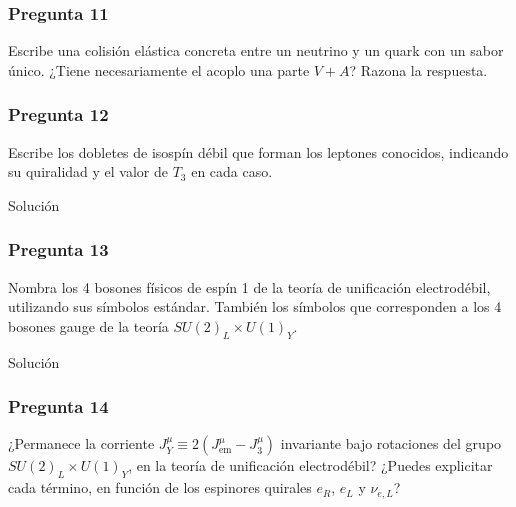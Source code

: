 \vspace*{2em}
\begin{Enunciado}
	\subsubsection*{Pregunta 11}

	Escribe una colisión elástica concreta entre un neutrino y un quark con un sabor único. ¿Tiene necesariamente el acoplo una parte $V + A$? Razona la respuesta.

\end{Enunciado}

\vspace*{2em}

\begin{Enunciado}
	\subsubsection*{Pregunta 12}

	Escribe los dobletes de isospín débil que forman los leptones conocidos, indicando su quiralidad y el valor de $T_3$ en cada caso.

\end{Enunciado}

Solución

\vspace*{2em}

\begin{Enunciado}
	\subsubsection*{Pregunta 13}

	Nombra los 4 bosones físicos de espín 1 de la teoría de unificación electrodébil, utilizando sus símbolos estándar. También los símbolos que corresponden a los 4 bosones gauge de la teoría $SU(2)_L \times U(1)_Y$.

\end{Enunciado}

Solución

\vspace*{2em}

\begin{Enunciado}
	\subsubsection*{Pregunta 14}

	¿Permanece la corriente $J_Y^\mu \equiv 2(J^\mu_{\text{em}} - J^\mu_3)$ invariante bajo rotaciones del grupo $SU(2)_L \times U(1)_Y$, en la teoría de unificación electrodébil? ¿Puedes explicitar cada término, en función de los espinores quirales $e_R$, $e_L$ y $\nu_{e,L}$?

\end{Enunciado}

